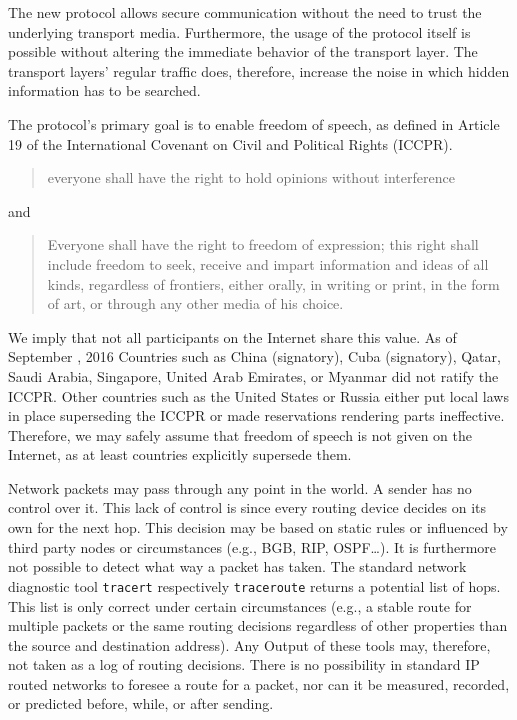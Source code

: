 The new protocol allows secure communication without the need to trust the underlying transport media. Furthermore, the usage of the protocol itself is possible without altering the immediate behavior of the transport layer. The transport layers' regular traffic does, therefore, increase the noise in which hidden information has to be searched. 

The protocol's primary goal is to enable freedom of speech, as defined in Article 19 of the International Covenant on Civil and Political Rights (ICCPR)\cite{iccpr}.
\begin{quote}
	everyone shall have the right to hold opinions without interference 
\end{quote}
and
\begin{quote}
	Everyone shall have the right to freedom of expression; this right shall include freedom to seek, receive and impart information and ideas of all kinds, regardless of frontiers, either orally, in writing or print, in the form of art, or through any other media of his choice.
\end{quote}

We imply that not all participants on the Internet share this value. As of September , 2016 Countries such as China (signatory), Cuba (signatory), Qatar, Saudi Arabia, Singapore, United Arab Emirates, or Myanmar did not ratify the ICCPR. Other countries such as the United States or Russia either put local laws in place superseding the ICCPR or made reservations rendering parts ineffective. Therefore, we may safely assume that freedom of speech is not given on the Internet, as at least countries explicitly supersede them.

Network packets may pass through any point in the world. A sender has no control over it. This lack of control is since every routing device decides on its own for the next hop. This decision may be based on static rules or influenced by third party nodes or circumstances (e.g., BGB, RIP, OSPF\ldots). It is furthermore not possible to detect what way a packet has taken. The standard network diagnostic tool \verb|tracert| respectively \verb|traceroute| returns a potential list of hops. This list is only correct under certain circumstances (e.g., a stable route for multiple packets or the same routing decisions regardless of other properties than the source and destination address). Any Output of these tools may, therefore, not taken as a log of routing decisions. There is no possibility in standard IP routed networks to foresee a route for a packet, nor can it be measured, recorded, or predicted before, while, or after sending. 

